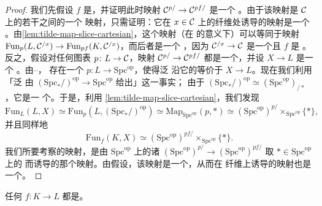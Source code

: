 \begin{proof}
我们先假设 $f$ 是\trCofinal{}，并证明此时映射 $\mathcal{C}^{p/} \to \mathcal{C}^{pf/}$ 是一个%
\trJoyalEquivalence{}。由于该映射是 $\mathcal{C}$ 上的若干\trLeftFibration{}之间的一个
映射，只需证明：它在\trObject{} $x \in \mathcal{C}$ 上的纤维处诱导的映射是一个%
\trEquivalence{}。由\cref{lem:tilde-map-slice-cartesian}，这个映射（在%
\trHomotopyEquivalence{}的意义下）可以等同于映射
$\mathrm{Fun}_p(L, \mathcal{C}^{/x}) \to \mathrm{Fun}_{pf}(K, \mathcal{C}^{/x})$，而后者是一个%
\trEquivalence{}，因为 $\mathcal{C}^{/x} \to \mathcal{C}$ 是一个\trRightFibration{}且 $f$ 是%
\trCofinal{}。反之，假设对任何图表 $p\colon L \to \mathcal{C}$，映射
$\mathcal{C}^{p/} \to \mathcal{C}^{pf/}$ 都是一个\trJoyalEquivalence{}，并设 $X \to L$ 是一个%
\trRightFibration{}。由\trStraightening{}--\trUnstraightening{}\trEquivalence{}，
存在一个\trFunctor{} $p\colon L \to \mathrm{Spc}^{\mathrm{op}}$，使得泛%
\trRightFibration{}沿它的\trPullback{}等价于 $X \to L$。现在我们利用「泛%
\trRightFibration{}由
$(\mathrm{Spc}_*/)^{\mathrm{op}} \to \mathrm{Spc}^{\mathrm{op}}$ 给出」这一事实；
由于
$(\mathrm{Spc}_*/)^{\mathrm{op}} \simeq (\mathrm{Spc}^{\mathrm{op}})_{/*}$，它是一
个\trRepresentable{}\trRightFibration{}。于是，利用%
\cref{lem:tilde-map-slice-cartesian}，我们发现
\[
\mathrm{Fun}_L(L, X) \simeq \mathrm{Fun}_p(L, (\mathrm{Spc}_*/)^{\mathrm{op}})
  \simeq \mathrm{Map}_{\mathrm{Spc}^{\mathrm{op}}}(p, *)
  \simeq (\mathrm{Spc}^{\mathrm{op}})^{p/}
  \times_{\mathrm{Spc}^{\mathrm{op}}} \{*\},
\]
并且同样地
\[
\mathrm{Fun}_f(K, X) \simeq (\mathrm{Spc}^{\mathrm{op}})^{pf/}
  \times_{\mathrm{Spc}^{\mathrm{op}}} \{*\}.
\]
我们所要考察的映射，是由 $\mathrm{Spc}^{\mathrm{op}}$ 上的诸\trLeftFibration{}%
$(\mathrm{Spc}^{\mathrm{op}})^{p/} \to (\mathrm{Spc}^{\mathrm{op}})^{pf/}$
取 $* \in \mathrm{Spc}^{\mathrm{op}}$ 上的%
\trFibre{}而诱导的那个映射。由假设，该映射是一个\trJoyalEquivalence{}，从而在
纤维上诱导的映射也是一个\trJoyalEquivalence{}。
\end{proof}

\begin{corollary}\label{cor:joyal-equiv-cofinal}
任何\trJoyalEquivalence{} $f\colon K \to L$ 都是\trCofinal{}。
\end{corollary}

